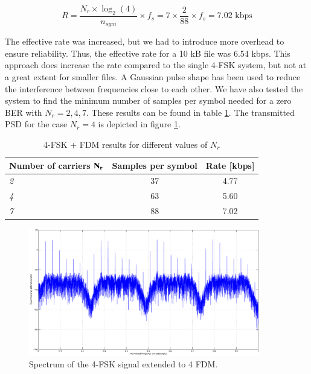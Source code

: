 \documentclass[12pt,a4paper,openright]{report}
\begin{document}
$$ R = \frac{N_r\times \log_2(4)}{n_{sym}}\times f_s = 7 \times \frac{2}{88}\times f_s =7.02 \text{ kbps}$$


The effective rate was increased, but we had to introduce more overhead to ensure reliability. Thus, the effective rate for a 10 kB file was 6.54 kbps. This approach does increase the rate compared to the single 4-FSK system, but not at a great extent for smaller files.  A Gaussian pulse shape has been used to reduce the interference between frequencies close to each other. We have also tested the system to find the minimum number of samples per symbol needed for a zero BER with \(N_r=2,4,7\).
These results can be found in table \ref{table:FDM}. The transmitted PSD for the case \(N_r= 4\) is depicted in figure \ref{fig:4FSKFDM}.

\begin{table} [h]
\centering
\begin{tabular}{lcc} 
\hline
\bf Number of carriers \(\bf N_r\)	&  \bf{Samples per symbol}  & \bf{Rate} \textnormal{[kbps]} \\
\hline
\emph{2}        & 37           & 4.77    \\
\emph{4}        & 63           & 5.60     \\
\emph{7}        & 88           & 7.02     \\
\hline
\end{tabular}
\caption[4-FSK + FDM results for different number of FDM carriers]{4-FSK + FDM results for different values of \(N_r\)}
\label{table:FDM}
\end{table}


\begin{figure}[H]
  \centering
    \includegraphics[width=0.9\textwidth]{4FDMspectrum.eps}
    \caption[4-FSK spectrum]{Spectrum of the 4-FSK signal extended to 4 FDM.}
    \label{fig:4FSKFDM}
\end{figure}
\end{document}
